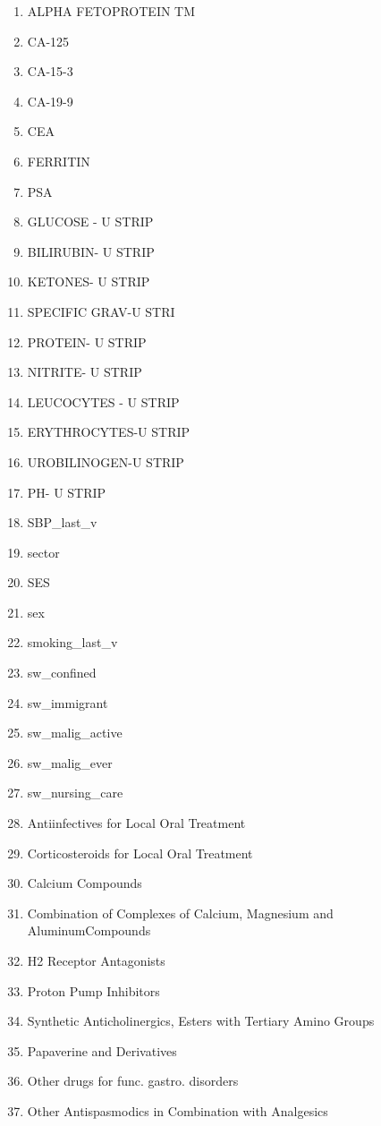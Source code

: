 \documentclass[a4paper,12pt]{article}
\begin{document}
\begin{appendices}
\begin{enumerate}
   			\item ALPHA FETOPROTEIN TM
   			\item CA-125
   			\item CA-15-3
   			\item CA-19-9
   			\item CEA
   			\item FERRITIN
   			\item PSA
   			\item GLUCOSE - U STRIP
   			\item BILIRUBIN- U STRIP
   			\item KETONES- U STRIP
   			\item SPECIFIC GRAV-U STRI
   			\item PROTEIN- U STRIP
   			\item NITRITE- U STRIP
   			\item LEUCOCYTES - U STRIP
   			\item ERYTHROCYTES-U STRIP
   			\item UROBILINOGEN-U STRIP
   			\item PH- U STRIP
   			\item SBP\_last\_v
   			\item sector
   			\item SES
   			\item sex
   			\item smoking\_last\_v
   			\item sw\_confined
   			\item sw\_immigrant
   			\item sw\_malig\_active
   			\item sw\_malig\_ever
   			\item sw\_nursing\_care
   			\item Antiinfectives for Local Oral Treatment
   			\item Corticosteroids for Local Oral Treatment
   			\item Calcium Compounds
   			\item Combination of Complexes of Calcium, Magnesium and AluminumCompounds
   			\item H2 Receptor Antagonists
   			\item Proton Pump Inhibitors
   			\item Synthetic Anticholinergics, Esters with Tertiary Amino Groups
   			\item Papaverine and Derivatives
   			\item Other drugs for func. gastro. disorders
   			\item Other Antispasmodics in Combination with Analgesics

\end{enumerate}
\end{appendices}
\end{document}
